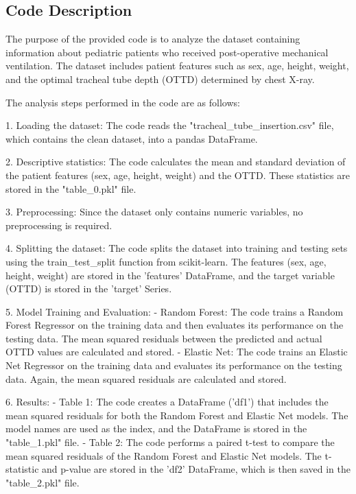 \documentclass[11pt]{article}
\begin{document}
\subsection{Code Description}

The purpose of the provided code is to analyze the dataset containing information about pediatric patients who received post-operative mechanical ventilation. The dataset includes patient features such as sex, age, height, weight, and the optimal tracheal tube depth (OTTD) determined by chest X-ray.

The analysis steps performed in the code are as follows:

1. Loading the dataset: The code reads the "tracheal\_tube\_insertion.csv" file, which contains the clean dataset, into a pandas DataFrame.

2. Descriptive statistics: The code calculates the mean and standard deviation of the patient features (sex, age, height, weight) and the OTTD. These statistics are stored in the "table\_0.pkl" file.

3. Preprocessing: Since the dataset only contains numeric variables, no preprocessing is required.

4. Splitting the dataset: The code splits the dataset into training and testing sets using the train\_test\_split function from scikit-learn. The features (sex, age, height, weight) are stored in the 'features' DataFrame, and the target variable (OTTD) is stored in the 'target' Series.

5. Model Training and Evaluation:
    - Random Forest: The code trains a Random Forest Regressor on the training data and then evaluates its performance on the testing data. The mean squared residuals between the predicted and actual OTTD values are calculated and stored.
    - Elastic Net: The code trains an Elastic Net Regressor on the training data and evaluates its performance on the testing data. Again, the mean squared residuals are calculated and stored.

6. Results:
    - Table 1: The code creates a DataFrame ('df1') that includes the mean squared residuals for both the Random Forest and Elastic Net models. The model names are used as the index, and the DataFrame is stored in the "table\_1.pkl" file.
    - Table 2: The code performs a paired t-test to compare the mean squared residuals of the Random Forest and Elastic Net models. The t-statistic and p-value are stored in the 'df2' DataFrame, which is then saved in the "table\_2.pkl" file.
\end{document}
